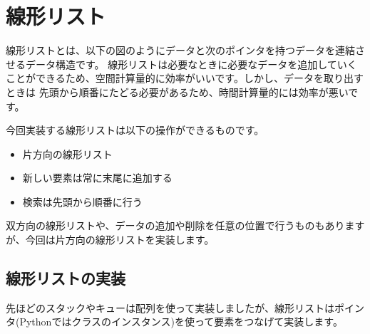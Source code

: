 \newpage

\section{線形リスト}

線形リストとは、以下の図のようにデータと次のポインタを持つデータを連結させるデータ構造です。
線形リストは必要なときに必要なデータを追加していくことができるため、空間計算量的に効率がいいです。しかし、データを取り出すときは
先頭から順番にたどる必要があるため、時間計算量的には効率が悪いです。

今回実装する線形リストは以下の操作ができるものです。

\begin{itemize}
	\item 片方向の線形リスト
	\item 新しい要素は常に末尾に追加する
	\item 検索は先頭から順番に行う
\end{itemize}

双方向の線形リストや、データの追加や削除を任意の位置で行うものもありますが、今回は片方向の線形リストを実装します。

\vspace{1cm}


\vspace{1cm}

\subsection{線形リストの実装}
先ほどのスタックやキューは配列を使って実装しましたが、線形リストはポインタ(Pythonではクラスのインスタンス)を使って要素をつなげて実装します。

